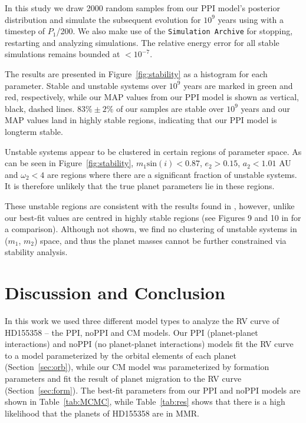 In this study we draw 2000 random samples from our PPI model's posterior distribution and simulate the subsequent evolution for $10^9$ years using \whfast with a timestep of $P_1$/200. 
We also make use of the {\tt Simulation Archive} \citep{Rein2017} for stopping, restarting and analyzing simulations. 
The relative energy error for all stable simulations remains bounded at $< 10^{-7}$.

The results are presented in Figure~\ref{fig:stability} as a histogram for each parameter.
Stable and unstable systems over $10^9$ years are marked in green and red, respectively, while our MAP values from our PPI model is shown as vertical, black, dashed lines. 
$83\% \pm 2\%$ of our samples are stable over $10^9$ years and our MAP values land in highly stable regions, indicating that our PPI model is longterm stable. 

Unstable systems appear to be clustered in certain regions of parameter space.
As can be seen in Figure~\ref{fig:stability}, $m_1\textrm{sin}(i)<0.87$, $e_2>0.15$, $a_2<1.01$ AU and $\omega_2<4$ are regions where there are a significant fraction of unstable systems.
It is therefore unlikely that the true planet parameters lie in these regions. 

These unstable regions are consistent with the results found in \R, however, unlike \R our best-fit values are centred in highly stable regions (see Figures 9 and 10 in \R for a comparison). 
Although not shown, we find no clustering of unstable systems in ($m_1$, $m_2$) space, and thus the planet masses cannot be further constrained via stability analysis.  

\section{Discussion and Conclusion}
\label{sec:conc}
In this work we used three different model types to analyze the RV curve of HD155358 -- the PPI, noPPI and CM models. 
Our PPI (planet-planet interactions) and noPPI (no planet-planet interactions) models fit the RV curve to a model parameterized by the orbital elements of each planet (Section~\ref{sec:orb}), while our CM model was parameterized by formation parameters and fit the result of planet migration to the RV curve (Section~\ref{sec:form}).
The best-fit parameters from our PPI and noPPI models are shown in Table~\ref{tab:MCMC}, while Table~\ref{tab:res} shows that there is a high likelihood that the planets of HD155358 are in MMR. 


